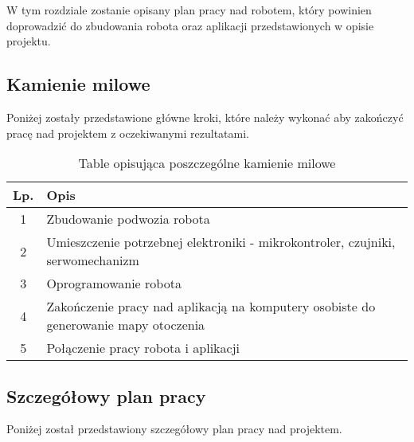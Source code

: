 
	
	W tym rozdziale zostanie opisany plan pracy nad robotem, który powinien doprowadzić do zbudowania robota oraz aplikacji przedstawionych w opisie projektu.
	
	\subsection{Kamienie milowe}
	
	Poniżej zostały przedstawione główne kroki, które należy wykonać aby zakończyć pracę nad projektem z oczekiwanymi rezultatami.
	
	\begin{table}[h]
	\centering
		\begin{tabularx}{0.8\linewidth}{|c|X|}
			\hline
			Lp. & Opis \\ \hline
			1  & Zbudowanie podwozia robota \\ \hline
			2  & Umieszczenie potrzebnej elektroniki - mikrokontroler, czujniki, serwomechanizm  \\ \hline
			3 & Oprogramowanie robota \\ \hline
			4 & Zakończenie pracy nad aplikacją na komputery osobiste do generowanie mapy otoczenia \\ \hline
			5 & Połączenie pracy robota i aplikacji \\ \hline
		\end{tabularx}
		\caption{Table opisująca poszczególne kamienie milowe}
	\end{table}
\subsection{Szczegółowy plan pracy}
	
	Poniżej został przedstawiony szczegółowy plan pracy nad projektem.

	
	

